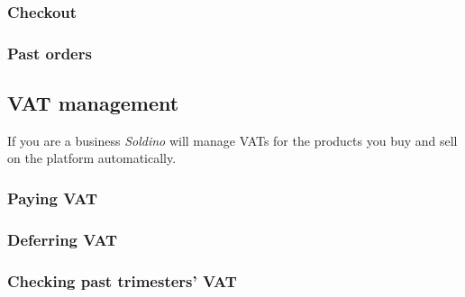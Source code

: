 	\subsubsection{Checkout}
	\subsubsection{Past orders}
	
	\subsection{VAT management}
	If you are a business \textit{Soldino} will manage VATs for the products 
	you buy and sell on the platform automatically.
		\subsubsection{Paying VAT}
	
		\subsubsection{Deferring VAT}
		
		\subsubsection{Checking past trimesters' VAT}
		